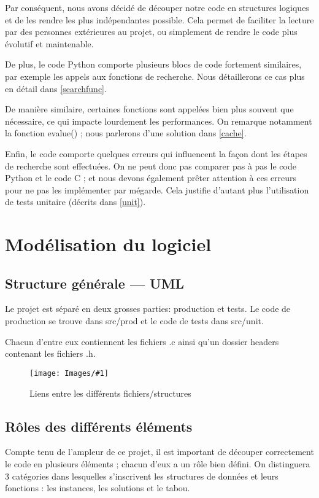 \documentclass[hideweeklyreports]{polytech/polytech}
\newcommand{\img}[3]{%
	\begin{figure}[H]
		\centering
   		\texttt{[image: Images/\#1]}
  	 	\caption{#2}
	\end{figure}
}
\begin{document}
			Par conséquent, nous avons décidé de découper notre code en structures logiques et de les rendre les plus indépendantes possible. Cela permet de faciliter la lecture par des personnes extérieures au projet, ou simplement de rendre le code plus évolutif et maintenable.
			
			De plus, le code Python comporte plusieurs blocs de code fortement similaires, par exemple les appels aux fonctions de recherche. Nous détaillerons ce cas plus en détail dans \autoref{searchfunc}.
			
			De manière similaire, certaines fonctions sont appelées bien plus souvent que nécessaire, ce qui impacte lourdement les performances. On remarque notamment la fonction evalue() ; nous parlerons d'une solution dans \autoref{cache}.
			
			Enfin, le code comporte quelques erreurs qui influencent la façon dont les étapes de recherche sont effectuées. On ne peut donc pas comparer pas à pas le code Python et le code C ; et nous devons également prêter attention à ces erreurs pour ne pas les implémenter par mégarde. Cela justifie d'autant plus l'utilisation de tests unitaire (décrits dans \autoref{unit}).
			
		
	\chapter{Modélisation du logiciel} %
		\section{Structure générale — UML}
			Le projet est séparé en deux grosses parties: production et tests.
			Le code de production se trouve dans src/prod et le code de tests dans src/unit.
			
			Chacun d'entre eux contiennent les fichiers .c ainsi qu'un dossier headers contenant les fichiers .h.
			
			\img{UML.png}{Liens entre les différents fichiers/structures}{0.45}

		\section{Rôles des différents éléments}
			Compte tenu de l'ampleur de ce projet, il est important de découper correctement le code en plusieurs éléments ; chacun d'eux a un rôle bien défini. On distinguera 3 catégories dans lesquelles s'inscrivent les structures de données et leurs fonctions : les instances, les solutions et le tabou.
			
\end{document}
